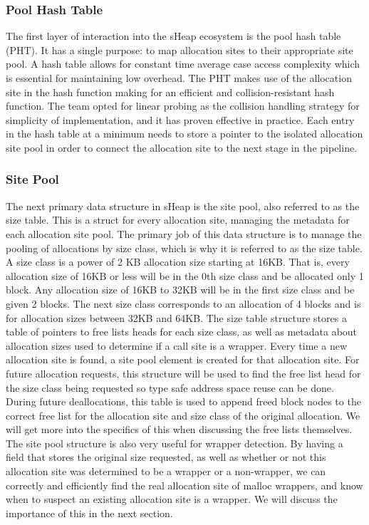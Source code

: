 \documentclass[conference]{IEEEtran}
\begin{document}
\subsubsection{Pool Hash Table}
The first layer of interaction into the sHeap ecosystem is the pool hash table 
(PHT). It has a single purpose: to map allocation sites to their appropriate 
site pool. A hash table allows for constant time average case access complexity 
which is essential for maintaining low overhead. The PHT makes use of the 
allocation site in the hash function making for an efficient and 
collision-resistant hash function. The team opted for linear probing as the 
collision handling strategy for simplicity of implementation, and it has proven 
effective in practice. Each entry in the hash table at a minimum needs to store 
a pointer to the isolated allocation site pool in order to connect the 
allocation site to the next stage in the pipeline.

\subsubsection{Site Pool}
The next primary data structure in sHeap is the site pool, also referred to as the size table. This is a struct for 
every allocation site, managing the metadata for each allocation site pool. The 
primary job of this data structure is to manage the pooling of allocations by 
size class, which is why it is referred to as the size table. A size class is a power of 2 KB allocation size starting at 16KB. 
That is, every allocation size of 16KB or less will be in the 0th size class 
and be allocated only 1 block. Any allocation size of 16KB to 32KB will be in 
the first size class and be given 2 blocks. The next size class corresponds 
to an allocation of 4 blocks and is for allocation sizes between 32KB and 64KB. 
The size table structure stores a table of pointers to free lists heads for each 
size class, as well as metadata about allocation sizes used to determine if a 
call site is a wrapper. Every time a new allocation site is found, a site pool 
element is created for that allocation site. For future allocation requests, this 
structure will be used to find the free list head for the size class being 
requested so type safe address space reuse can be done. During future deallocations, 
this table is used to append freed block nodes to the correct free list for the 
allocation site and size class of the original allocation. We will get more into 
the specifics of this when discussing the free lists themselves. The site pool 
structure is also very useful for wrapper detection. By having a field that 
stores the original size requested, as well as whether or not this allocation site 
was determined to be a wrapper or a non-wrapper, we can correctly and efficiently 
find the real allocation site of malloc wrappers, and know when to suspect an 
existing allocation site is a wrapper. We will discuss the importance of this in 
the next section.
\end{document}
